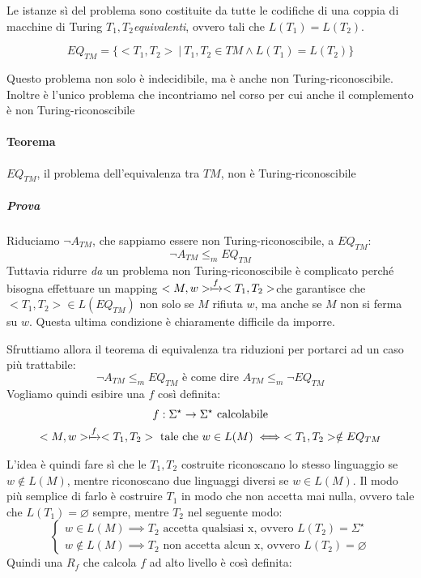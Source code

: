 Le istanze sì del problema sono costituite da tutte le codifiche di una coppia di macchine di Turing $T_1, T_2$\textit{equivalenti}, ovvero tali che $L(T_1) = L(T_2)$. 

\[
	EQ_{TM} = \{ <T_1, T_2> \ | \ T_1, T_2 \in TM \land L(T_1) = L(T_2)  \}
\]

Questo problema non solo è indecidibile, ma è anche non Turing-riconoscibile. Inoltre è l'unico problema che incontriamo nel corso per cui anche il complemento è non Turing-riconoscibile

\paragraph{Teorema} $EQ_{TM}$, il problema dell'equivalenza tra $TM$, non è Turing-riconoscibile

\subparagraph{Prova} Riduciamo $\neg A_{TM}$, che sappiamo essere non Turing-riconoscibile, a $EQ_{TM}$:
\[
	\neg A_{TM} \leq_m EQ_{TM}
\]
Tuttavia ridurre \textit{da} un problema non Turing-riconoscibile è complicato perché bisogna effettuare un mapping $<M, w> \xmapsto{f} <T_1, T_2>$che garantisce che $<T_1, T_2> \in L(EQ_{TM})$ non solo se $M$ rifiuta $w$, ma anche se $M$ non si ferma su $w$. Questa ultima condizione è chiaramente difficile da imporre.

Sfruttiamo allora il teorema di equivalenza tra riduzioni per portarci ad un caso più trattabile:
\[
	\neg A_{TM} \leq_m EQ_{TM} \text{ è come dire } A_{TM} \leq_m \neg EQ_{TM}
\]
Vogliamo quindi esibire una $f$ così definita:
\begin{gather*}
	f: \Sigma^{\star} \to \Sigma^{\star} \text{ calcolabile} \\
	<M, w> \xmapsto{f} <T_1, T_2> \text{ tale che } w \in L(M) \iff <T_1, T_2> \notin EQ_{TM}
\end{gather*}

L'idea è quindi fare sì che le $T_1, T_2$ costruite riconoscano lo stesso linguaggio se $w \notin L(M)$, mentre riconoscano due linguaggi diversi se $w \in L(M)$. Il modo più semplice di farlo è costruire $T_1$ in modo che non accetta mai nulla, ovvero tale che $L(T_1) = \varnothing$ sempre, mentre $T_2$ nel seguente modo:
\[
	\begin{cases}
		w \in L(M) \implies T_2 \text{ accetta qualsiasi x, ovvero } L(T_2) = \Sigma^{\star} \\
		w \notin L(M) \implies T_2 \text{ non accetta alcun x, ovvero } L(T_2) = \varnothing
	\end{cases}
\]
Quindi una $R_f$ che calcola $f$ ad alto livello è così definita:

